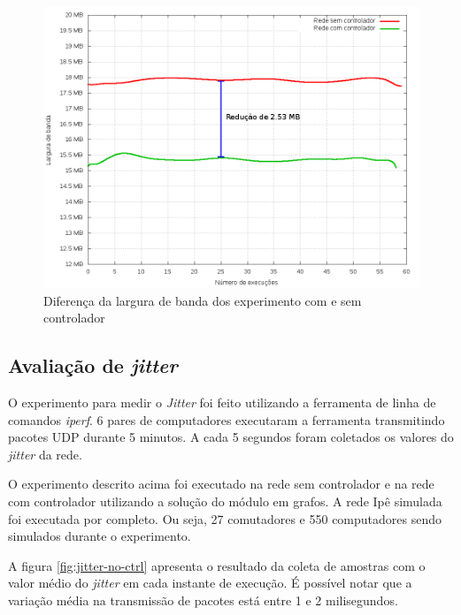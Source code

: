 \begin{figure}[!htb]
    \centering
    \label{fig:bandwidth-diff}
    \includegraphics[width=\linewidth]{img/bandwidth-diff}
    \caption{Diferença da largura de banda dos experimento com e sem
    controlador}
\end{figure}



\subsection{Avaliação de \emph{jitter}}

O experimento para medir o \emph{Jitter} foi feito utilizando a ferramenta 
de linha de comandos \emph{iperf}.
6 pares de computadores executaram a ferramenta transmitindo pacotes 
UDP durante 5 minutos.
A cada 5 segundos foram coletados os valores do \emph{jitter} da rede.

O experimento descrito acima foi executado na rede sem controlador e na rede
com controlador utilizando a solução do módulo em grafos.
A rede Ipê simulada foi executada por completo.
Ou seja, 27 comutadores e 550 computadores sendo simulados durante o
experimento.

A figura \ref{fig:jitter-no-ctrl} apresenta o resultado da coleta de amostras 
com o valor médio do \emph{jitter} em cada instante de execução.
É possível notar que a variação média na transmissão de pacotes está entre
1 e 2 milisegundos.

